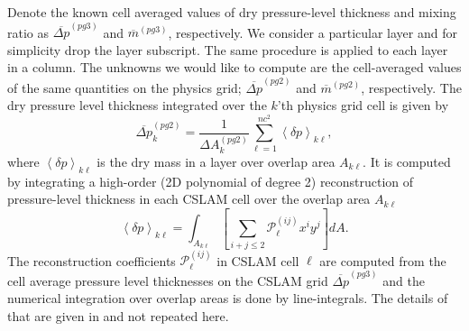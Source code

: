 \documentclass[draft,linenumbers]{agujournal}
\begin{document}
Denote the known cell averaged values of dry pressure-level thickness and mixing ratio as $\overline{\Delta p}^{(pg3)}$ and $\overline{m}^{(pg3)}$, respectively. We consider a particular layer and for simplicity drop the layer subscript. The same procedure is applied to each layer in a column. The unknowns we would like to compute are the cell-averaged values of the same quantities on the physics grid; $\overline{\Delta p}^{(pg2)}$ and $\overline{m}^{(pg2)}$, respectively. The dry pressure level thickness integrated over the $k$'th physics grid cell is given by
\begin{equation}
\label{eq:p}
\overline{\Delta p}^{(pg2)}_k=\frac{1}{\Delta A^{(pg2)}_k}\sum_{\ell=1}^{nc^2}\left<\delta p\right>_{k\ell},
\end{equation}
where $\left< \delta p\right>_{k\ell}$ is the dry mass in a layer over overlap area $A_{k\ell}$. It is computed by integrating a high-order (2D polynomial of degree 2) reconstruction of pressure-level thickness in each CSLAM cell over the overlap area $A_{k\ell}$
\begin{equation}
\label{eq:pg3dp}
\left< \delta p\right>_{k\ell}=\int_{A_{k\ell}}\left[ \sum_{i+j\le 2}{\mathcal{P}}^{(ij)}_\ell x^{i}y^{j}\right] dA.
\end{equation}
The reconstruction coefficients ${\mathcal{P}}^{(ij)}_\ell$ in CSLAM cell $\ell$ are computed from the cell average pressure level thicknesses on the CSLAM grid $\overline{\Delta p}^{(pg3)}$ and the numerical integration over overlap areas is done by line-integrals. The details of that are given in \cite{LNU2010JCP} and not repeated here.
\end{document}
